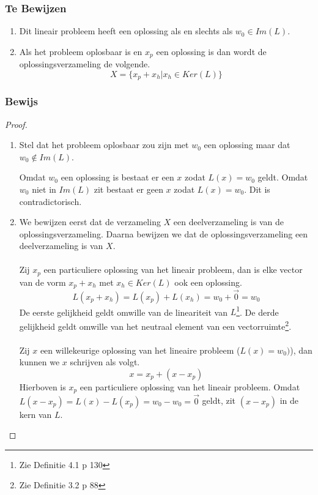 \documentclass[lineaire_algebra_oplossingen.tex]{subfiles}
\begin{document}
\subsubsection*{Te Bewijzen}
\begin{enumerate}
\item Dit lineair probleem heeft een oplossing als en slechts als $w_0 \in Im(L)$.

\item
Als het probleem oplosbaar is en $x_p$ een oplossing is dan wordt de oplossingsverzameling de volgende.
\[
X = \{x_p + x_h | x_h \in Ker(L)\}
\]
\end{enumerate}

\subsubsection*{Bewijs}
\begin{proof}
\begin{enumerate}
\item Stel dat het probleem oplosbaar zou zijn met $w_0$ een oplossing maar dat $w_0 \not\in Im(L)$.

Omdat $w_0$ een oplossing is bestaat er een $x$ zodat $L(x) = w_0$ geldt. Omdat $w_0$ niet in $Im(L)$ zit bestaat er geen $x$ zodat $L(x) = w_0$. Dit is contradictorisch.
\item
We bewijzen eerst dat de verzameling $X$ een deelverzameling is van de oplossingsverzameling. Daarna bewijzen we dat de oplossingsverzameling een deelverzameling is van $X$.\\\\
Zij $x_p$ een particuliere oplossing van het lineair probleem, dan is elke vector van de vorm $x_p+x_h$ met $x_h\in Ker(L)$ ook een oplossing.
\[
L(x_p+x_h)=L(x_p)+L(x_h)=w_0+\vec{0} = w_0
\]
De eerste gelijkheid geldt omwille van de lineariteit van $L$\footnote{Zie Definitie 4.1 p 130}. De derde gelijkheid geldt omwille van het neutraal element van een vectorruimte\footnote{Zie Definitie 3.2 p 88}.\\\\
Zij $x$ een willekeurige oplossing van het lineaire probleem ($L(x)=w_0)$), dan kunnen we $x$ schrijven als volgt.
\[
x = x_p + (x-x_p)
\]
Hierboven is $x_p$ een particuliere oplossing van het lineair probleem. Omdat $L(x-x_p) = L(x) - L(x_p) = w_0-w_0=\vec{0}$ geldt, zit $(x-x_p)$ in de kern van $L$.
\end{enumerate}
\end{proof}
\end{document}
